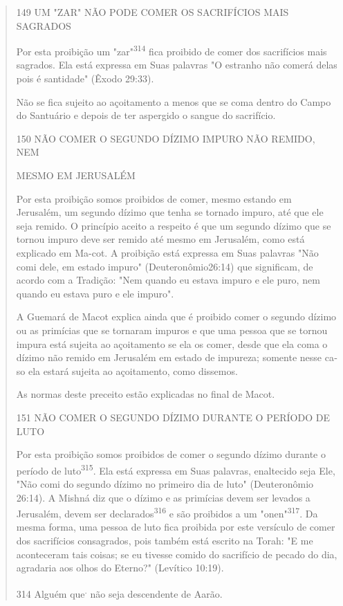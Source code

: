 \begin{quote}
149 UM "ZAR" NÃO PODE COMER OS SACRIFÍCIOS MAIS SAGRADOS

Por esta proibição um "zar"\textsuperscript{314} fica proibido de comer
dos sacrifí­cios mais sagrados. Ela está expressa em Suas palavras "O
estranho não comerá delas pois é santidade" (Êxodo 29:33).

Não se fica sujeito ao açoitamento a menos que se coma dentro do Campo
do Santuário e depois de ter aspergido o sangue do sacrifício.

150 NÃO COMER O SEGUNDO DÍZIMO IMPURO NÃO REMIDO, NEM

MESMO EM JERUSALÉM

Por esta proibição somos proibidos de comer, mesmo estando em Jerusalém,
um segundo dízimo que tenha se tornado impuro, até que ele seja remido.
O princípio aceito a respeito é que um segundo dízimo que se tornou
impuro deve ser remido até mesmo em Jerusalém, como está explicado em
Ma-cot. A proibição está expressa em Suas palavras "Não comi dele, em
estado im­puro" (Deuteronômio26:14) que significam, de acordo com a
Tradição: "Nem quando eu estava impuro e ele puro, nem quando eu estava
puro e ele impuro".

A Guemará de Macot explica ainda que é proibido comer o segundo dízimo
ou as primícias que se tornaram impuros e que uma pessoa que se tor­nou
impura está sujeita ao açoitamento se ela os comer, desde que ela coma o
dízimo não remido em Jerusalém em estado de impureza; somente nesse
ca­so ela estará sujeita ao açoitamento, como dissemos.

As normas deste preceito estão explicadas no final de Macot.

151 NÃO COMER O SEGUNDO DÍZIMO DURANTE O PERÍODO DE LUTO

Por esta proibição somos proibidos de comer o segundo dízimo du­rante o
período de luto\textsuperscript{315}. Ela está expressa em Suas
palavras, enaltecido seja Ele, "Não comi do segundo dízimo no primeiro
dia de luto" (Deuteronômio 26:14). A Mishná diz que o dízimo e as
primícias devem ser levados a Jerusa­lém, devem ser
declarados\textsuperscript{316} e são proibidos a um
"onen"\textsuperscript{317}. Da mesma for­ma, uma pessoa de luto fica
proibida por este versículo de comer dos sacrifí­cios consagrados, pois
também está escrito na Torah: "E me aconteceram tais coisas; se eu
tivesse comido do sacrifício de pecado do dia, agradaria aos olhos do
Eterno?" (Levítico 10:19).

314 Alguém que\textsuperscript{.} não seja descendente de Aarão.
\end{quote}

